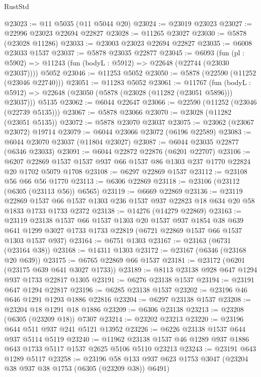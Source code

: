 \begin{lexlean}{RustStd}
\begin{coremodule}
@23023 := @11 @5035 (@11 @5044 @20)
@23024 := @23019 @23023
@23027 := @22996 @23023 @22694 @22827
@23028 := @11265 @23027
@23030 := @5878 (@23028 @11286)
@23033 := @23003 @23023 @22694 @22827
@23035 := @6008 @23033 @1537
@23037 := @5878 @23035 @22877
@23045 := @6093
    (fun (pl : @5902) => @11243 (fun (bodyL : @5912) => @22648 (@22744 (@23030 @23037))))
    @5052
@23046 := @11253 @5052
@23050 := @5878 (@22590 (@11252 (@23046 @22740)))
@23051 := @11283 @5052
@23061 := @11767
    (fun (bodyL : @5912) => @22648 (@23050 (@5878 (@23028 (@11282 (@23051 @5896))) @23037)))
    @5135
@23062 := @6044 @22647
@23066 := @22590 (@11252 (@23046 (@22739 @5135)))
@23067 := @5878 @23066
@23070 := @23028 (@11282 (@23051 @5135))
@23072 := @5878 @23070 @23037
@23075 := @23062 (@23067 @23072) @19714
@23079 := @6044 @23066 @23072 (@6196 @22589)
@23083 := @6044 @23070 @23037 (@11804 @23027)
@23087 := @6044 @23035 @22877 (@6346 @23033)
@23091 := @6044 @22872 @22876 (@6201 @22707)
@23106 := @6207 @22869 @1537 @1537 @937 @66 @1537 @86 @1303 @237 @1770 @22824 @20 @1702 @5079 @1708
@23108 := @6297 @22869 @1537
@23112 := @23108 @56 @66 @56 @1770
@23113 := @6306 @22869
@23118 := @23106 (@23112 (@6305 (@23113 @56)) @6565)
@23119 := @6669 @22869
@23136 := @23119
    @22869
    @1537
    @66
    @1537
    @1303
    @236
    @1537
    @937
    @22823
    @18
    @634
    @20
    @58
    @1833
    @1733
    @1733
    @2372
@23138 := @14276 (@14279 @22869)
@23163 := @23119
    @23138
    @1537
    @66
    @1537
    @1303
    @20
    @1537
    @937
    @1854
    @38
    @639
    @641
    @1299
    @3027
    @1733
    @1733
    @22819
    (@6721 @22869 @1537 @66 @1537 @1303 @1537 @937)
@23164 := @6751 @1303
@23167 := @23163 (@6731 (@23164 @38))
@23168 := @14311 @1303
@23172 := @23167 (@6346 (@23168 @20 @639))
@23175 := @6765 @22869 @66 @1537
@23181 := @23172 (@6201 (@23175 @639 @641 @3027 @1733))
@23189 := @8113 @23138 @928 @647 @1294 @937 @1733 @22817 @1305
@23191 := @6276 @23138 @1537
@23194 := @23191 @647 @1294 @22817
@23196 := @6285 @23138 @1537
@23202 := @23196 @46 @646 @1291 @1293 @1886 @22816
@23204 := @6297 @23138 @1537
@23208 := @23204 @18 @1291 @18 @1886
@23209 := @6306 @23138
@23213 := @23208 (@6305 (@23209 @18)) @7307
@23214 := @23202 @23213
@23220 := @23196 @644 @511 @937 @241 @5121 @13952
@23226 := @6226 @23138 @1537 @644 @937 @5114 @5119
@23240 := @11962 @23138 @1537 @46 @1289 @937 @1886 @643 @1733 @5117 @1537 @2625 @5106 @5110 @23213
@23243 := @23191 @643 @1289 @5117
@23258 := @23196
    @58
    @133
    @937
    @623
    @1753
    @3047
    (@23204 @38 @937 @38 @1753 (@6305 (@23209 @38)) @6491)

\end{coremodule}
\end{lexlean}
